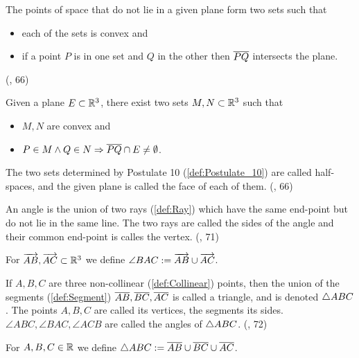 \begin{definition}\label{def:Postulate_10}
  The points of space that do not lie in a given plane form two sets such that
  \begin{itemize}
    \item each of the sets is convex and
    \item if a point $P$ is in one set and $Q$ in the other then $\overline{PQ}$ intersects the plane.
  \end{itemize}
  (\cite{SMSGGeometry}, 66)

  Given a plane $E \subset \mathbb{R}^3$, there exist two sets $M,N \subset \mathbb{R}^3$ such that
  \begin{itemize}
    \item $M,N$ are convex and
    \item $P\in M \land Q\in N \Rightarrow \overline{PQ}\cap E \ne \emptyset$.
  \end{itemize}
\end{definition}

\begin{definition}\label{def:Half-Spaces}
  The two sets determined by Postulate 10 (\ref{def:Postulate_10}) are called half-spaces, and the given plane is called the face of each of them.
  (\cite{SMSGGeometry}, 66)
\end{definition}

\begin{definition}[Angle]\label{def:Angle}
  An angle is the union of two rays (\ref{def:Ray}) which have the same end-point but do not lie in the same line.
  The two rays are called the sides of the angle and their common end-point is calles the vertex.
  (\cite{SMSGGeometry}, 71)

  For $\overrightarrow{AB}, \overrightarrow{AC} \subset \mathbb{R}^3$ we define $\angle BAC:= \overrightarrow{AB} \cup \overrightarrow{AC}$.
\end{definition}

\begin{definition}[Triangle]\label{def:Triangle}
  If $A,B,C$ are three non-collinear (\ref{def:Collinear}) points, then the union of the segments (\ref{def:Segment})
  $\overline{AB}, \overline{BC}, \overline{AC}$ is called a triangle, and is denoted $\bigtriangleup{ABC}$.
  The points $A,B,C$ are called its vertices, the segments its sides.
  $\angle ABC, \angle BAC, \angle ACB$ are called the angles of $\bigtriangleup{ABC}$.
  (\cite{SMSGGeometry}, 72)

  For $A,B,C \in \mathbb{R}$ we define $\bigtriangleup{ABC}:=\overline{AB}\cup \overline{BC}\cup\overline{AC}$.
\end{definition}

